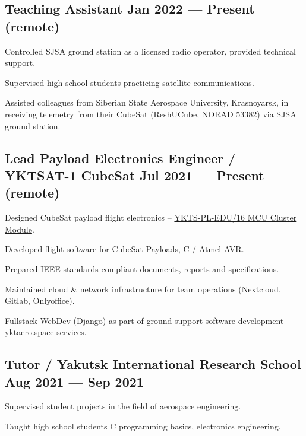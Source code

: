 \documentclass[letter,10pt]{article}
\begin{document}
\subsection{{Teaching Assistant \hfill Jan 2022 --- Present (remote)}}
\begin{zitemize}
\item Controlled SJSA ground station as a licensed radio operator, provided technical support.
\item Supervised high school students practicing satellite communications.
\item Assisted colleagues from Siberian State Aerospace University, Krasnoyarsk, in receiving telemetry from their CubeSat (ReshUCube, NORAD 53382) via SJSA ground station.
\end{zitemize}

\subsection{{Lead Payload Electronics Engineer / YKTSAT-1 CubeSat \hfill Jul 2021 --- Present (remote)}}
\begin{zitemize}
\item Designed CubeSat payload flight electronics -- \href{https://yktaero.space/projects/item/ykts-pl-edu16-sptx}{YKTS-PL-EDU/16 MCU Cluster Module}.
\item Developed flight software for CubeSat Payloads, C / Atmel AVR.
\item Prepared IEEE standards compliant documents, reports and specifications.
\item Maintained cloud \& network infrastructure for team operations (Nextcloud, Gitlab, Onlyoffice).
\item Fullstack WebDev (Django) as part of ground support software development -- \url{yktaero.space} services.
\end{zitemize}

\subsection{{Tutor / Yakutsk International Research School \hfill Aug 2021 --- Sep 2021}}
\begin{zitemize}
\item Supervised student projects in the field of aerospace engineering.
\item Taught high school students C programming basics, electronics engineering.
\end{zitemize}
\end{document}
